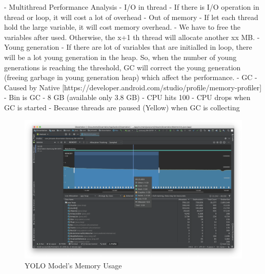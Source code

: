             -	Multithread Performance Analysis
                - I/O in thread
                    - If there is I/O operation in thread or loop, it will cost a lot of overhead
                - Out of memory
                    - If let each thread hold the large variable, it will cost memory overhead.
                    - We have to free the variables after used. Otherwise, the x+1 th thread will allocate another xx MB.
                - Young generation
                    - If there are lot of variables that are initialled in loop, there will be a lot young generation in the heap. So, when the number of young generations is reaching the threshold, GC will correct the young generation (freeing garbage in young generation heap) which affect the performance.
                - GC
                    - Caused by Native [https://developer.android.com/studio/profile/memory-profiler]
                    - Bin is GC
                    - 8 GB (available only 3.8 GB)
                - CPU hits 100%
                - CPU drops when GC is started
                        - Because threads are paused (Yellow) when GC is collecting

        \begin{figure}[!ht]
            \includegraphics[width=6in]{images/chapter5/gc-problem/gc-collecting.png}
            \caption{YOLO Model's Memory Usage}
            \label{yolo:memoryUsage}
        \end{figure}

